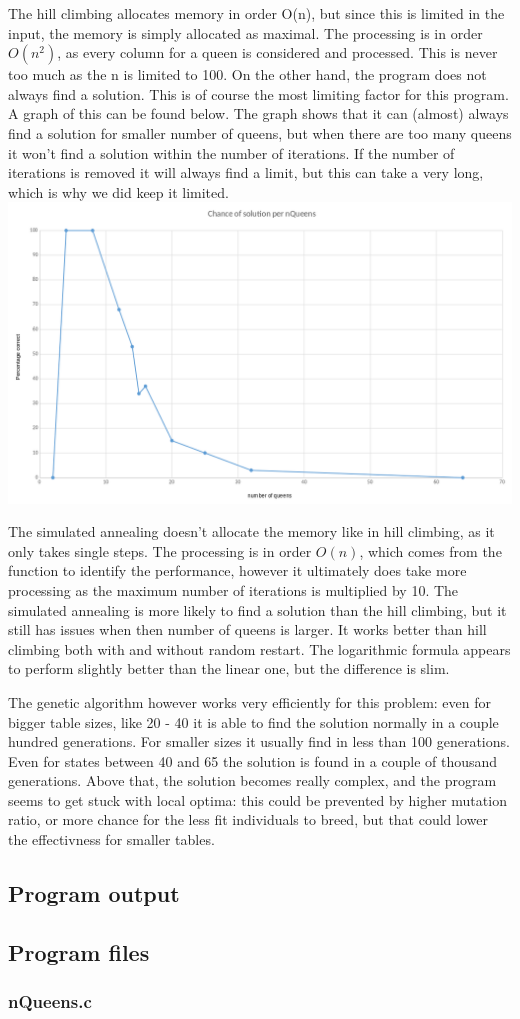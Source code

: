 \documentclass{article}
\begin{document}
The hill climbing allocates memory in order O(n), but since this is limited in the input, the memory is simply allocated as maximal. The processing is in order $O(n^2)$, as every column for a queen is considered and processed. This is never too much as the n is limited to 100. On the other hand, the program does not always find a solution. This is of course the most limiting factor for this program. A graph of this can be found below. The graph shows that it can (almost) always find a solution for smaller number of queens, but when there are too many queens it won't find a solution within the number of iterations. If the number of iterations is removed it will always find a limit, but this can take a very long, which is why we did keep it limited.
\includegraphics[scale=0.2]{./HillClimbGraph.png}

The simulated annealing doesn't allocate the memory like in hill climbing, as it only takes single steps. The processing is in order $O(n)$, which comes from the function to identify the performance, however it ultimately does take more processing as the maximum number of iterations is multiplied by 10. The simulated annealing is more likely to find a solution than the hill climbing, but it still has issues when then number of queens is larger. It works better than hill climbing both with and without random restart. The logarithmic formula appears to perform slightly better than the linear one, but the difference is slim. 

The genetic algorithm however works very efficiently for this problem: even for bigger table sizes, like 20 - 40 it is able to find the solution normally in a couple hundred generations. For smaller sizes it usually find in less than 100 generations. Even for states between 40 and 65 the solution is found in a couple of thousand generations. Above that, the solution becomes really complex, and the program seems to get stuck with local optima: this could be prevented by higher mutation ratio, or more chance for the less fit individuals to breed, but that could lower the effectivness for smaller tables.

\subsection*{Program output}


\subsection*{Program files}
\subsubsection*{nQueens.c}

\end{document}
